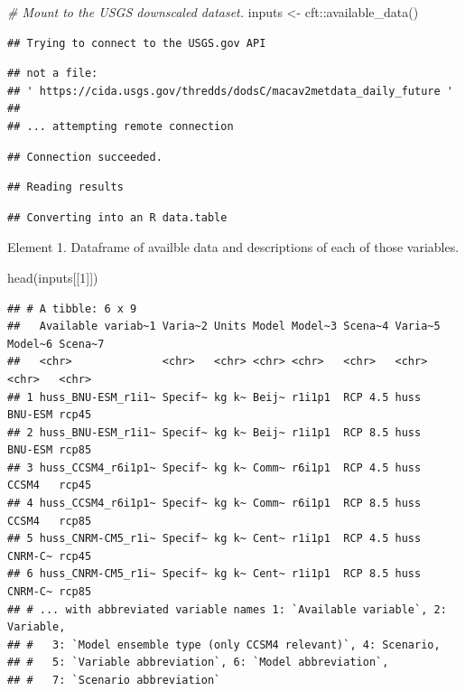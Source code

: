 \documentclass[
  paper=a4,
  ,captions=tableheading
]{scrartcl}
\newenvironment{Shaded}{\begin{snugshade}}{\end{snugshade}}
\newcommand{\CommentTok}[1]{\textcolor[rgb]{0.56,0.35,0.01}{\textit{#1}}}
\newcommand{\DecValTok}[1]{\textcolor[rgb]{0.00,0.00,0.81}{#1}}
\newcommand{\FunctionTok}[1]{\textcolor[rgb]{0.00,0.00,0.00}{#1}}
\newcommand{\NormalTok}[1]{#1}
\newcommand{\OtherTok}[1]{\textcolor[rgb]{0.56,0.35,0.01}{#1}}
\newcommand{\SpecialCharTok}[1]{\textcolor[rgb]{0.00,0.00,0.00}{#1}}
\begin{document}
\begin{Shaded}
\begin{Highlighting}[]
\CommentTok{\# Mount to the USGS downscaled dataset. }
\NormalTok{inputs }\OtherTok{\textless{}{-}}\NormalTok{ cft}\SpecialCharTok{::}\FunctionTok{available\_data}\NormalTok{()}
\end{Highlighting}
\end{Shaded}

\begin{verbatim}
## Trying to connect to the USGS.gov API
\end{verbatim}

\begin{verbatim}
## not a file: 
## ' https://cida.usgs.gov/thredds/dodsC/macav2metdata_daily_future '
## 
## ... attempting remote connection
\end{verbatim}

\begin{verbatim}
## Connection succeeded.
\end{verbatim}

\begin{verbatim}
## Reading results
\end{verbatim}

\begin{verbatim}
## Converting into an R data.table
\end{verbatim}

Element 1. Dataframe of availble data and descriptions of each of those
variables.

\begin{Shaded}
\begin{Highlighting}[]
\FunctionTok{head}\NormalTok{(inputs[[}\DecValTok{1}\NormalTok{]])}
\end{Highlighting}
\end{Shaded}

\begin{verbatim}
## # A tibble: 6 x 9
##   Available variab~1 Varia~2 Units Model Model~3 Scena~4 Varia~5 Model~6 Scena~7
##   <chr>              <chr>   <chr> <chr> <chr>   <chr>   <chr>   <chr>   <chr>  
## 1 huss_BNU-ESM_r1i1~ Specif~ kg k~ Beij~ r1i1p1  RCP 4.5 huss    BNU-ESM rcp45  
## 2 huss_BNU-ESM_r1i1~ Specif~ kg k~ Beij~ r1i1p1  RCP 8.5 huss    BNU-ESM rcp85  
## 3 huss_CCSM4_r6i1p1~ Specif~ kg k~ Comm~ r6i1p1  RCP 4.5 huss    CCSM4   rcp45  
## 4 huss_CCSM4_r6i1p1~ Specif~ kg k~ Comm~ r6i1p1  RCP 8.5 huss    CCSM4   rcp85  
## 5 huss_CNRM-CM5_r1i~ Specif~ kg k~ Cent~ r1i1p1  RCP 4.5 huss    CNRM-C~ rcp45  
## 6 huss_CNRM-CM5_r1i~ Specif~ kg k~ Cent~ r1i1p1  RCP 8.5 huss    CNRM-C~ rcp85  
## # ... with abbreviated variable names 1: `Available variable`, 2: Variable,
## #   3: `Model ensemble type (only CCSM4 relevant)`, 4: Scenario,
## #   5: `Variable abbreviation`, 6: `Model abbreviation`,
## #   7: `Scenario abbreviation`
\end{verbatim}
\end{document}
